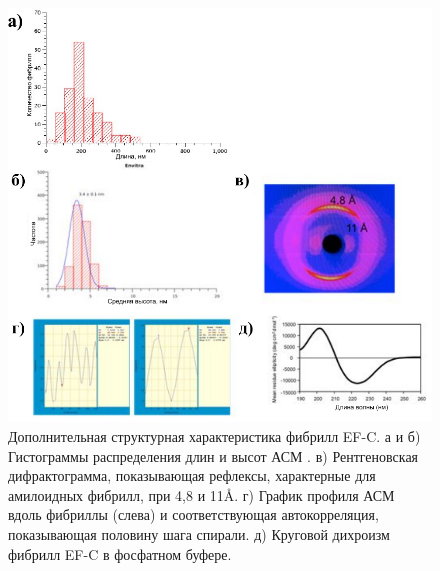     \begin{figure} [H]
    \centering
    \includegraphics[width=\textwidth]{images/p4/natnanotech2013/modeling/p4_modeling_sf5.pdf}
    \caption[Дополнительная структурная характеристика фибрилл EF-C]{Дополнительная структурная характеристика фибрилл EF-C. а и б) Гистограммы распределения длин и высот АСМ . в) Рентгеновская дифрактограмма, показывающая рефлексы, характерные для амилоидных фибрилл, при 4,8 и 11\AA. г) График профиля АСМ вдоль фибриллы (слева) и соответствующая автокорреляция, показывающая половину шага спирали. д) Круговой дихроизм фибрилл EF-C в фосфатном буфере.}
    \label{fig:p4_modeling_sf5}
\end{figure}
    
